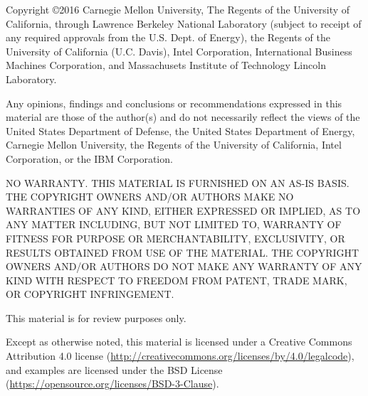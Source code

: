 \documentclass[11pt]{extbook}
\begin{document}
\vfill



Copyright \copyright 2016 Carnegie Mellon University, The Regents 
of the University of California, through Lawrence Berkeley National 
Laboratory (subject to receipt of any required approvals from the 
U.S. Dept. of Energy), the Regents of the University of California 
(U.C. Davis), Intel Corporation, International Business Machines Corporation,
and Massachusets Institute of Technology Lincoln Laboratory. 

Any opinions, findings and conclusions or recommendations expressed in 
this material are those of the author(s) and do not necessarily reflect 
the views of the United States Department of Defense, the United States 
Department of Energy, Carnegie Mellon University, the Regents of the 
University of California, Intel Corporation, or the IBM Corporation.  

NO WARRANTY. THIS MATERIAL IS FURNISHED ON AN AS-IS BASIS. THE COPYRIGHT 
OWNERS AND/OR AUTHORS MAKE NO WARRANTIES OF ANY KIND, EITHER EXPRESSED 
OR IMPLIED, AS TO ANY MATTER INCLUDING, BUT NOT LIMITED TO, WARRANTY OF 
FITNESS FOR PURPOSE OR MERCHANTABILITY, EXCLUSIVITY, OR RESULTS OBTAINED 
FROM USE OF THE MATERIAL. THE COPYRIGHT OWNERS AND/OR AUTHORS DO NOT MAKE 
ANY WARRANTY OF ANY KIND WITH RESPECT TO FREEDOM FROM PATENT, TRADE MARK, 
OR COPYRIGHT INFRINGEMENT.

\begin{center}
{\Large This material is for review purposes only.}
\end{center}


Except as otherwise noted, this material is licensed under a Creative Commons Attribution 4.0 license (\href{http://creativecommons.org/licenses/by/4.0/legalcode}{http://creativecommons.org/licenses/by/4.0/legalcode}), 
and examples are licensed under the BSD License (\href{https://opensource.org/licenses/BSD-3-Clause}{https://opensource.org/licenses/BSD-3-Clause}).

\end{document}
